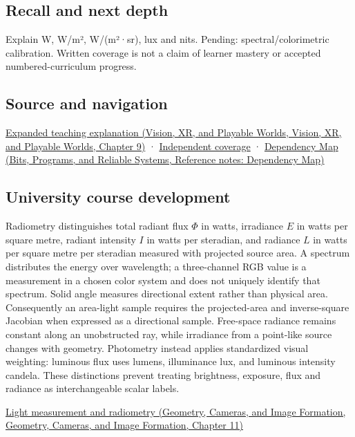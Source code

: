 \subsection{Recall and next depth}\label{appendix-215c2570199b-recall-and-next-depth}

Explain W, W/m², W/(m²·sr), lux and nits. Pending: spectral/colorimetric calibration. Written coverage is not a claim of learner mastery or accepted numbered-curriculum progress.

\subsection{Source and navigation}\label{appendix-215c2570199b-source-and-navigation}

\href{../07-Vision-XR-and-Playable-Worlds/main.pdf\#nameddest=04-visual-computing-ii-ch042-light-must-become-a-quantity-before-it-becomes-a-color}{Expanded teaching explanation (Vision, XR, and Playable Worlds, Vision, XR, and Playable Worlds, Chapter 9)} · \hyperref[appendix-fd090d982a15-xr01---independent-seeing-and-representation-source]{Independent coverage} · \href{../01-Bits-Programs-and-Reliable-Systems/main.pdf\#nameddest=appendix-4ad47bdd269a}{Dependency Map (Bits, Programs, and Reliable Systems, Reference notes: Dependency Map)}

\subsection{University course development}\label{appendix-215c2570199b-university-course-development}

Radiometry distinguishes total radiant flux \(\Phi\) in watts, irradiance \(E\) in watts per square metre, radiant intensity \(I\) in watts per steradian, and radiance \(L\) in watts per square metre per steradian measured with projected source area. A spectrum distributes the energy over wavelength; a three-channel RGB value is a measurement in a chosen color system and does not uniquely identify that spectrum. Solid angle measures directional extent rather than physical area. Consequently an area-light sample requires the projected-area and inverse-square Jacobian when expressed as a directional sample. Free-space radiance remains constant along an unobstructed ray, while irradiance from a point-like source changes with geometry. Photometry instead applies standardized visual weighting: luminous flux uses lumens, illuminance lux, and luminous intensity candela. These distinctions prevent treating brightness, exposure, flux and radiance as interchangeable scalar labels.

\href{../03-Geometry-Cameras-and-Image-Formation/main.pdf\#nameddest=03-visual-computing-i-ch004-light-measurement-and-radiometry}{Light measurement and radiometry (Geometry, Cameras, and Image Formation, Geometry, Cameras, and Image Formation, Chapter 11)}
